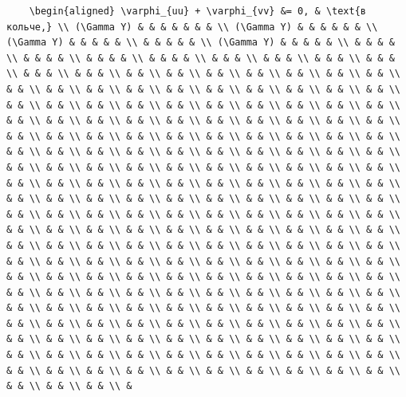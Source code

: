 \documentclass[
  ukrainian,
]{article}
\begin{document}
\begin{verbatim}
    \begin{aligned} \varphi_{uu} + \varphi_{vv} &= 0, & \text{в кольче,} \\ (\Gamma Y) & & & & & & & \\ (\Gamma Y) & & & & & & \\ (\Gamma Y) & & & & & \\ & & & & & \\ (\Gamma Y) & & & & & \\ & & & & \\ & & & & \\ & & & & \\ & & & & \\ & & & \\ & & & \\ & & & \\ & & & \\ & & & \\ & & & \\ & & \\ & & \\ & & \\ & & \\ & & \\ & & \\ & & \\ & & \\ & & \\ & & \\ & & \\ & & \\ & & \\ & & \\ & & \\ & & \\ & & \\ & & \\ & & \\ & & \\ & & \\ & & \\ & & \\ & & \\ & & \\ & & \\ & & \\ & & \\ & & \\ & & \\ & & \\ & & \\ & & \\ & & \\ & & \\ & & \\ & & \\ & & \\ & & \\ & & \\ & & \\ & & \\ & & \\ & & \\ & & \\ & & \\ & & \\ & & \\ & & \\ & & \\ & & \\ & & \\ & & \\ & & \\ & & \\ & & \\ & & \\ & & \\ & & \\ & & \\ & & \\ & & \\ & & \\ & & \\ & & \\ & & \\ & & \\ & & \\ & & \\ & & \\ & & \\ & & \\ & & \\ & & \\ & & \\ & & \\ & & \\ & & \\ & & \\ & & \\ & & \\ & & \\ & & \\ & & \\ & & \\ & & \\ & & \\ & & \\ & & \\ & & \\ & & \\ & & \\ & & \\ & & \\ & & \\ & & \\ & & \\ & & \\ & & \\ & & \\ & & \\ & & \\ & & \\ & & \\ & & \\ & & \\ & & \\ & & \\ & & \\ & & \\ & & \\ & & \\ & & \\ & & \\ & & \\ & & \\ & & \\ & & \\ & & \\ & & \\ & & \\ & & \\ & & \\ & & \\ & & \\ & & \\ & & \\ & & \\ & & \\ & & \\ & & \\ & & \\ & & \\ & & \\ & & \\ & & \\ & & \\ & & \\ & & \\ & & \\ & & \\ & & \\ & & \\ & & \\ & & \\ & & \\ & & \\ & & \\ & & \\ & & \\ & & \\ & & \\ & & \\ & & \\ & & \\ & & \\ & & \\ & & \\ & & \\ & & \\ & & \\ & & \\ & & \\ & & \\ & & \\ & & \\ & & \\ & & \\ & & \\ & & \\ & & \\ & & \\ & & \\ & & \\ & & \\ & & \\ & & \\ & & \\ & & \\ & & \\ & & \\ & & \\ & & \\ & & \\ & & \\ & & \\ & & \\ & & \\ & & \\ & & \\ & & \\ & & \\ & & \\ & & \\ & & \\ & & \\ & & \\ & & \\ & & \\ & & \\ & 
\end{verbatim}
\end{document}
